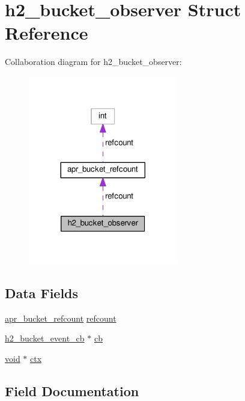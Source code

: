 \hypertarget{structh2__bucket__observer}{}\section{h2\+\_\+bucket\+\_\+observer Struct Reference}
\label{structh2__bucket__observer}


Collaboration diagram for h2\+\_\+bucket\+\_\+observer\+:
\nopagebreak
\begin{figure}[H]
\begin{center}
\leavevmode
\includegraphics[width=185pt]{structh2__bucket__observer__coll__graph}
\end{center}
\end{figure}
\subsection*{Data Fields}
\begin{DoxyCompactItemize}
\item 
\hyperlink{structapr__bucket__refcount}{apr\+\_\+bucket\+\_\+refcount} \hyperlink{structh2__bucket__observer_a2f1549ed2736fa362cacd711875fbc41}{refcount}
\item 
\hyperlink{h2__filter_8h_a82f9f56235bc2cd5b56b1c55c552a234}{h2\+\_\+bucket\+\_\+event\+\_\+cb} $\ast$ \hyperlink{structh2__bucket__observer_aedce8ee49102d649447de558589a59dd}{cb}
\item 
\hyperlink{group__MOD__ISAPI_gacd6cdbf73df3d9eed42fa493d9b621a6}{void} $\ast$ \hyperlink{structh2__bucket__observer_a90ac92da0f21babd5805114aabdda2f9}{ctx}
\end{DoxyCompactItemize}


\subsection{Field Documentation}
